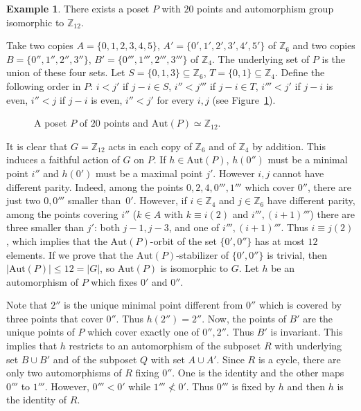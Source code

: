 \documentclass[10pt,a4paper]{amsart}
\renewcommand{\varphi}{h}
\newcommand{\Z}{\mathbb{Z}}
\newcommand{\aut}{\textrm{Aut}}
\theoremstyle{plain}
\theoremstyle{definition}
\newtheorem{ej}[cdrthm]{Example}
\theoremstyle{remark}
\begin{document}
\begin{ej} \label{ejemplo12}
There exists a poset $P$ with $20$ points and automorphism group isomorphic to $\Z_{12}$.

Take two copies $A=\{0,1,2,3,4,5\}$, $A'=\{0',1',2',3',4',5'\}$ of $\Z_6$ and two copies $B=\{0'',1'',2'',3''\}$, $B'=\{0''',1''',2''',3'''\}$ of $\Z_4$. The underlying set of $P$ is the union of these four sets. Let $S=\{0,1,3\}\subseteq \Z_6$, $T=\{0,1\}\subseteq \Z_4$. Define the following order in $P$: $i<j'$ if $j-i\in S$, $i''<j'''$ if $j-i\in T$, $i'''<j'$ if $j-i$ is even, $i''<j$ if $j-i$ is even, $i''<j'$ for every $i,j$ (see Figure~\ref{figveinte}). 

\begin{figure}
\begin{center}


\caption{A poset $P$ of $20$ points and $\aut(P)\simeq \Z_{12}$.}\label{figveinte}
\end{center}
\end{figure}

It is clear that $G=\Z_{12}$ acts in each copy of $\Z_6$ and of $\Z_4$ by addition. This induces a faithful action of $G$ on $P$. If $\varphi\in \aut(P)$, $\varphi(0'')$ must be a minimal point $i''$ and $\varphi(0')$ must be a maximal point $j'$. However $i,j$ cannot have different parity. Indeed, among the points $0,2,4,0''',1'''$ which cover $0''$, there are just two $0,0'''$ smaller than~$0'$. However, if $i\in \Z_4$ and $j\in \Z_6$ have different parity, among the points covering $i''$ ($k\in A$ with $k\equiv i (2)$ and $i''', (i+1)'''$) there are three smaller than $j'$: both $j-1, j-3$, and one of $i''', (i+1)'''$. Thus $i\equiv j(2)$, which implies that the $\aut(P)$-orbit of the set $\{0',0''\}$ has at most $12$ elements. If we prove that the $\aut(P)$-stabilizer of $\{0',0''\}$ is trivial, then $|\aut(P)|\le 12=|G|$, so $\aut(P)$ is isomorphic to $G$.
Let $\varphi$ be an automorphism of $P$ which fixes $0'$ and $0''$.

Note that $2''$ is the unique minimal point different from $0''$ which is covered by three points that cover $0''$. Thus $\varphi(2'')=2''$. Now, the points of $B'$ are the unique points of $P$ which cover exactly one of $0'',2''$. Thus $B'$ is invariant. This implies that $\varphi$ restricts to an automorphism of the subposet $R$ with underlying set $B\cup B'$ and of the subposet $Q$ with set $A\cup A'$.
Since $R$ is a cycle, there are only two automorphisms of $R$ fixing $0''$. One is the identity and the other maps $0'''$ to $1'''$. However, $0'''<0'$ while $1'''\nless 0'$. Thus $0'''$ is fixed by $\varphi$ and then $\varphi$ is the identity of $R$. 


\end{ej}
\end{document}
